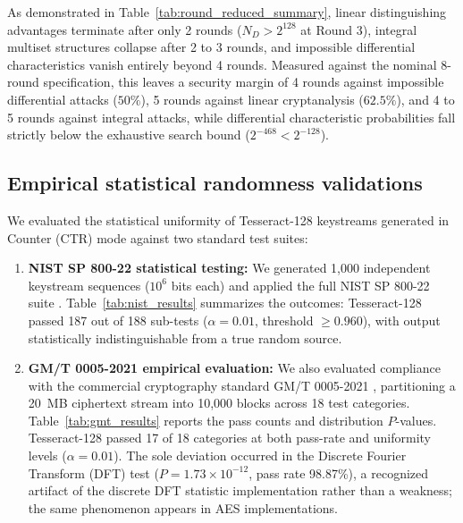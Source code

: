 \documentclass[review,12pt]{elsarticle}
\begin{document}
As demonstrated in Table~\ref{tab:round_reduced_summary}, linear distinguishing advantages terminate after only 2 rounds ($N_D > 2^{128}$ at Round 3), integral multiset structures collapse after 2 to 3 rounds, and impossible differential characteristics vanish entirely beyond 4 rounds. Measured against the nominal 8-round specification, this leaves a security margin of 4 rounds against impossible differential attacks ($50\%$), 5 rounds against linear cryptanalysis ($62.5\%$), and 4 to 5 rounds against integral attacks, while differential characteristic probabilities fall strictly below the exhaustive search bound ($2^{-468} < 2^{-128}$).

\subsection{Empirical statistical randomness validations}
We evaluated the statistical uniformity of Tesseract-128 keystreams generated in Counter (CTR) mode against two standard test suites:

\begin{enumerate}
\setlength{\itemsep}{1pt}
\setlength{\parsep}{0pt}
\setlength{\parskip}{0pt}
    \item \textbf{NIST SP 800-22 statistical testing:} We generated 1,000 independent keystream sequences ($10^6$ bits each) and applied the full NIST SP 800-22 suite \cite{rukhin2010nist}. Table~\ref{tab:nist_results} summarizes the outcomes: Tesseract-128 passed 187 out of 188 sub-tests ($\alpha = 0.01$, threshold $\ge 0.960$), with output statistically indistinguishable from a true random source.
    \item \textbf{GM/T 0005-2021 empirical evaluation:} We also evaluated compliance with the commercial cryptography standard GM/T 0005-2021 \cite{gmt0005}, partitioning a 20~MB ciphertext stream into 10,000 blocks across 18 test categories. Table~\ref{tab:gmt_results} reports the pass counts and distribution $P$-values. Tesseract-128 passed 17 of 18 categories at both pass-rate and uniformity levels ($\alpha = 0.01$). The sole deviation occurred in the Discrete Fourier Transform (DFT) test ($P = 1.73 \times 10^{-12}$, pass rate 98.87\%), a recognized artifact of the discrete DFT statistic implementation \cite{kim2004dft} rather than a weakness; the same phenomenon appears in AES implementations.
\end{enumerate}
\end{document}
